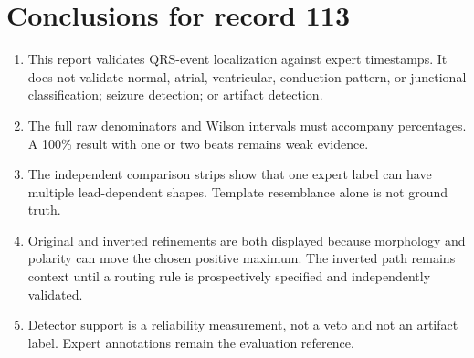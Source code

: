 \documentclass[11pt]{article}
\begin{document}
        \section{Conclusions for record 113}
        \begin{enumerate}
        \item This report validates QRS-event localization against expert timestamps. It does not validate
        normal, atrial, ventricular, conduction-pattern, or junctional classification;
        seizure detection; or artifact detection.
        \item The full raw denominators and Wilson intervals must accompany percentages. A 100\% result with
        one or two beats remains weak evidence.
        \item The independent comparison strips show that one expert label can have multiple lead-dependent
        shapes. Template resemblance alone is not ground truth.
        \item Original and inverted refinements are both displayed because morphology and polarity can move the
        chosen positive maximum. The inverted path remains context until a routing rule is prospectively specified
        and independently validated.
        \item Detector support is a reliability measurement, not a veto and not an artifact label. Expert
        annotations remain the evaluation reference.
        \end{enumerate}

        
        
        
\end{document}

